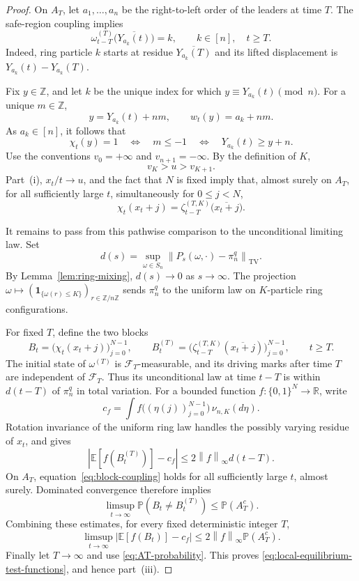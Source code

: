 \documentclass[10pt,a4paper]{amsart}
\newcommand{\Ee}{\mathbb E}
\newcommand{\Pp}{\mathbb P}
\newcommand{\R}{\mathbb R}
\newcommand{\TV}{\mathrm{TV}}
\newcommand{\Z}{\mathbb Z}
\newcommand{\cF}{\mathcal F}
\newcommand{\modn}[1]{\overline{#1}}
\newcommand{\norm}[1]{\left\lVert #1\right\rVert}
\newcommand{\one}{\mathbf 1}
\begin{document}
\begin{proof}
		On $A_T$, let $a_1,\ldots,a_n$ be the right-to-left order of the leaders at
		time $T$.  The safe-region coupling implies
		\begin{equation}\label{eq:ring-label-at-leader-residue}
			\omega_{t-T}^{(T)}\bigl(\modn{Y_{a_k}(t)}\bigr)=k,
			\qquad k\in[n],\quad t\ge T.
		\end{equation}
		Indeed, ring particle $k$ starts at residue
		$\modn{Y_{a_k}(T)}$ and its lifted displacement is
		$Y_{a_k}(t)-Y_{a_k}(T)$.
		
		Fix $y\in\Z$, and let $k$ be the unique index for which
		$y\equiv Y_{a_k}(t)\pmod n$.  For a unique $m\in\Z$,
		\[
		y=Y_{a_k}(t)+nm,
		\qquad
		w_t(y)=a_k+nm.
		\]
		As $a_k\in[n]$, it follows that
		\begin{equation}\label{eq:occupation-via-leader}
			\chi_t(y)=1
			\quad\Longleftrightarrow\quad
			m\le-1
			\quad\Longleftrightarrow\quad
			Y_{a_k}(t)\ge y+n.
		\end{equation}
		Use the conventions $v_0=+\infty$ and $v_{n+1}=-\infty$.  By the definition
		of $K$,
		\[
		v_K>u>v_{K+1}.
		\]
		Part~(i), $x_t/t\to u$, and the fact that $N$ is fixed imply that, almost
		surely on $A_T$, for all sufficiently large $t$, simultaneously for
		$0\le j<N$,
		\begin{equation}\label{eq:block-coupling}
			\chi_t(x_t+j)
			=\zeta_{t-T}^{(T,K)}\bigl(\modn{x_t+j}\bigr).
		\end{equation}
		
		It remains to pass from this pathwise comparison to the unconditional
		limiting law. Set
		\[
		d(s)=\sup_{\omega\in S_n}
		\norm{P_s(\omega,\cdot)-\pi_n^q}_{\TV}.
		\]
		By Lemma~\ref{lem:ring-mixing}, $d(s)\to0$ as $s\to\infty$.
		The projection $\omega\mapsto(\one_{\{\omega(r)\le K\}})_{r\in\Z/n\Z}$
		sends $\pi_n^q$ to the uniform law on $K$-particle ring configurations.
		
		For fixed $T$, define the two blocks
		\[
		B_t=\bigl(\chi_t(x_t+j)\bigr)_{j=0}^{N-1},\qquad
		B_t^{(T)}=
		\bigl(\zeta_{t-T}^{(T,K)}(\modn{x_t+j})\bigr)_{j=0}^{N-1},
		\qquad t\ge T.
		\]
		The initial state of $\omega^{(T)}$ is $\cF_T$-measurable, and its driving
		marks after time $T$ are independent of $\cF_T$. Thus its unconditional
		law at time $t-T$ is within $d(t-T)$ of $\pi_n^q$ in total variation.
		For a bounded function $f:\{0,1\}^N\to\R$, write
		\[
		c_f=\int f\bigl((\eta(j))_{j=0}^{N-1}\bigr)\,\nu_{n,K}(d\eta).
		\]
		Rotation invariance of the uniform ring law handles the possibly varying
		residue of $x_t$, and gives
		\[
		\left|\Ee[f(B_t^{(T)})]-c_f\right|
		\le 2\norm{f}_\infty d(t-T).
		\]
		On $A_T$, equation~\eqref{eq:block-coupling} holds for all sufficiently
		large $t$, almost surely. Dominated convergence therefore implies
		\[
		\limsup_{t\to\infty}\Pp(B_t\ne B_t^{(T)})\le\Pp(A_T^c).
		\]
		Combining these estimates, for every fixed deterministic integer $T$,
		\[
		\limsup_{t\to\infty}\left|\Ee[f(B_t)]-c_f\right|
		\le2\norm{f}_\infty\Pp(A_T^c).
		\]
		Finally let $T\to\infty$ and use \eqref{eq:AT-probability}. This proves
		\eqref{eq:local-equilibrium-test-functions}, and hence part~(iii).
	\end{proof}
\end{document}
